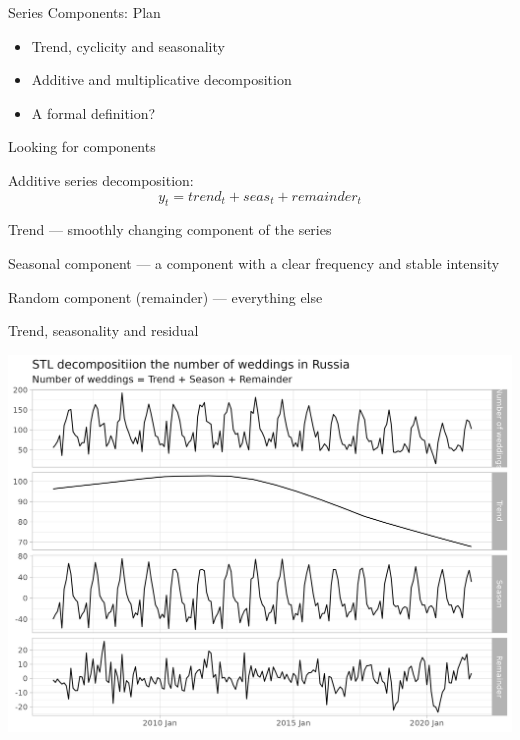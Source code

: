 
\begin{frame} %
	
	
\end{frame}



\begin{frame}{Series Components: Plan}
	\begin{itemize}[<+->]
		\item Trend, cyclicity and seasonality
		\item Additive and multiplicative decomposition
		\item A formal definition?
	\end{itemize}
	
\end{frame}


\begin{frame}{Looking for components}
	
	Additive series decomposition:
	\[
	y_t = trend_t + seas_t + remainder_t
	\]
	
	\pause
	
	\alert{Trend} — smoothly changing component of the series
	
	\pause
	
	\alert{Seasonal component} — a component with a clear frequency and stable intensity
	
	\pause
	
	\alert{Random component} (remainder) — everything else
	
\end{frame}

\begin{frame}{Trend, seasonality and residual}
	
	\includegraphics[width=\textwidth]{pictures/om_ts_01-041.png}
	
\end{frame}

